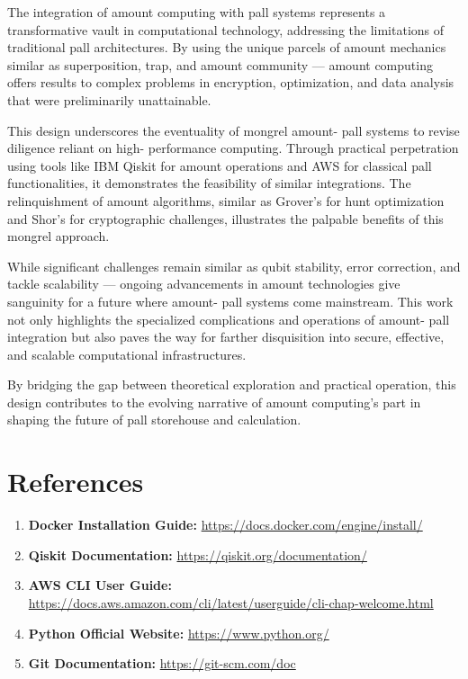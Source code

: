 \documentclass[12pt,a4paper]{article}
\begin{document}
The integration of amount computing with pall systems represents a transformative vault in computational technology, addressing the limitations of traditional pall architectures. By using the unique parcels of amount mechanics similar as superposition, trap, and amount community — amount computing offers results to complex problems in encryption, optimization, and data analysis that were preliminarily unattainable.

This design underscores the eventuality of mongrel amount- pall systems to revise diligence reliant on high- performance computing. Through practical perpetration using tools like IBM Qiskit for amount operations and AWS for classical pall functionalities, it demonstrates the feasibility of similar integrations. The relinquishment of amount algorithms, similar as Grover's for hunt optimization and Shor's for cryptographic challenges, illustrates the palpable benefits of this mongrel approach.

While significant challenges remain similar as qubit stability, error correction, and tackle scalability — ongoing advancements in amount technologies give sanguinity for a future where amount- pall systems come mainstream. This work not only highlights the specialized complications and operations of amount- pall integration but also paves the way for farther disquisition into secure, effective, and scalable computational infrastructures.

By bridging the gap between theoretical exploration and practical operation, this design contributes to the evolving narrative of amount computing's part in shaping the future of pall storehouse and calculation.

\newpage

\begin{center}
    \fontsize{14}{16}\selectfont \bfseries
    \section{References}
\end{center}


\begin{enumerate}
    \item \textbf{Docker Installation Guide:} \url{https://docs.docker.com/engine/install/}
    \item \textbf{Qiskit Documentation:} \url{https://qiskit.org/documentation/}
    \item \textbf{AWS CLI User Guide:} \url{https://docs.aws.amazon.com/cli/latest/userguide/cli-chap-welcome.html}
    \item \textbf{Python Official Website:} \url{https://www.python.org/}
    \item \textbf{Git Documentation:} \url{https://git-scm.com/doc}
\end{enumerate}


\end{document}
